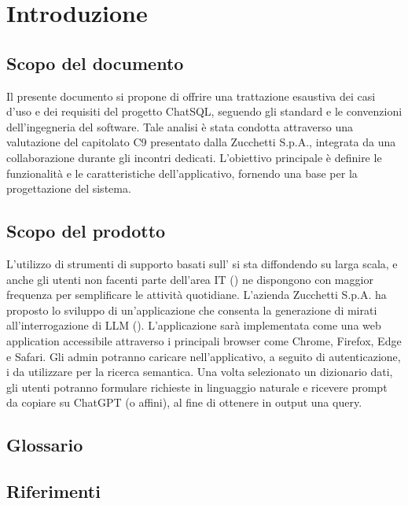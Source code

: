\section{Introduzione}

\subsection{Scopo del documento}
\par Il presente documento si propone di offrire una trattazione esaustiva dei casi d'uso e dei requisiti del progetto ChatSQL, seguendo gli standard e le convenzioni dell'ingegneria del software. Tale analisi è stata condotta attraverso una valutazione del capitolato C9 presentato dalla  Zucchetti S.p.A., integrata da una collaborazione durante gli incontri dedicati. L'obiettivo principale è definire le funzionalità e le caratteristiche dell’applicativo, fornendo una base per la progettazione del sistema.

\subsection{Scopo del prodotto}
\par L’utilizzo di strumenti di supporto basati sull’ si sta diffondendo su larga scala, e anche gli utenti non facenti parte dell’area IT () ne dispongono con maggior frequenza per semplificare le attività quotidiane. L’azienda Zucchetti S.p.A. ha proposto lo sviluppo di un’applicazione che consenta la generazione di  mirati all’interrogazione di LLM (). L'applicazione sarà implementata come una web application accessibile attraverso i principali browser come Chrome, Firefox, Edge e Safari. Gli admin potranno caricare nell’applicativo, a seguito di autenticazione, i  da utilizzare per la ricerca semantica. Una volta selezionato un dizionario dati, gli utenti potranno formulare richieste in linguaggio naturale e ricevere prompt da copiare su ChatGPT (o affini), al fine di ottenere in output una query.

\subsection{Glossario}
\GlossarioIntroduzione

\subsection{Riferimenti}
